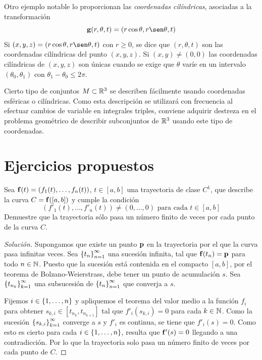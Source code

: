 Otro ejemplo notable lo proporcionan las {\it coordenadas cilíndricas}, asociadas a la transformación
$$\g(r,\theta, t)=(r\cos\theta,r\sen\theta,t)$$
Si $(x,y,z)=(r\cos\theta,r\sen\theta,t)$ con $r\geq 0$, se dice que $(r,\theta,t)$ son las coordenadas cilíndricas del punto $(x,y,z)$. Si $(x,y)\neq (0,0)$ las coordenadas cilíndricas de $(x,y,z)$ son únicas cuando se exige que $\theta$ varíe en un intervalo $(\theta_0,\theta_1)$ con $\theta_1-\theta_0\leq 2\pi$.

Cierto tipo de conjuntos $M\subset\mathbb{R}^3$ se describen fácilmente usando coordenadas esféricas o cilíndricas. Como esta descripción se utilizará con frecuencia al efectuar cambios de variable en integrales triples, conviene adquirir destreza en el problema geométrico de describir subconjuntos de $\mathbb{R}^3$ usando este tipo de coordenadas.

\section{Ejercicios propuestos}

\begin{ejer}
    Sea $\mathbf{f}(t)=(f_1(t),\dots,f_n(t))$, $t\in [a,b]$ una trayectoria de clase $C^1$, que describe la curva $C=\mathbf{f}([a,b])$ y cumple la condición
    $$(f'_1(t),\dots,f'_n(t))\neq (0,\dots,0)\text{ para cada }t\in [a,b]$$
    Demuestre que la trayectoria sólo pasa un número finito de veces por cada punto de la curva $C$.
\end{ejer}

\begin{proof}[Solución] Supongamos que existe un punto $\mathbf{p}$ en la trayectoria por el que la curva pasa infinitas veces. Sea $\left\lbrace t_n\right\rbrace_{n=1}^\infty$ una sucesión infinita, tal que $\mathbf{f}(t_n)=\mathbf{p}$ para todo $n\in\mathbb{N}$. Puesto que la sucesión está contenida en el compacto $[a,b]$, por el teorema de Bolzano-Weierstrass, debe tener un punto de acumulación $s$. Sea $\left\lbrace t_{n_k}\right\rbrace_{k=1}^\infty$ una subsucesión de $\left\lbrace t_n\right\rbrace_{n=1}^\infty$ que converja a $s$. 

Fijemos $i\in\left\lbrace1,\dots,n\right\rbrace$ y apliquemos el teorema del valor medio a la función $f_i$ para obtener $s_{k,i} \in[t_{n_k},t_{n_{k+1}}]$ tal que $f'_i(s_{k,i})=0$ para cada $k\in\mathbb{N}$. Como la sucesión $\left\lbrace s_{k,i}\right\rbrace_{k=1}^\infty$ converge a $s$ y $f'_i$ es continua, se tiene que $f'_i(s)=0$. Como esto es cierto para cada $i\in\left\lbrace1,\dots,n\right\rbrace$, resulta que $\mathbf{f}'(s)=0$ llegando a una contradicción. Por lo que la trayectoria solo pasa un número finito de veces por cada punto de $C$.
\end{proof}
